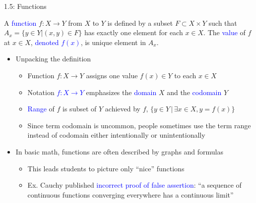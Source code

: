 \documentclass[10pt,english,aspectratio=169]{beamer}
\begin{document}
\begin{frame}{1.5: Functions}

\vspace{3mm}

\begin{definition}
A \textcolor{blue}{function} $f \colon X \rightarrow Y$ from $X$ to $Y$ is defined by a subset $F \subset X \times Y$ such that $A_x = \{ y\in Y | (x,y)\in F \}$ has exactly one element for each $x\in X$.
The \textcolor{blue}{value} of $f$ at $x\in X$, \textcolor{blue}{denoted $f(x)$}, is unique element in $A_x$.
\end{definition}

\begin{itemize}
\setlength\itemsep{3mm}
\item<2-> Unpacking the definition \vspace{1mm}
\begin{itemize} 
  \setlength\itemsep{1.5mm}
  \item<2-> Function $f \colon X\rightarrow Y$ assigns one value $f(x)\in Y$ to each $x\in X$
  \item<3-> Notation \textcolor{blue}{$f \colon X \rightarrow Y$} emphasizes the \textcolor{blue}{domain} $X$ and the \textcolor{blue}{codomain} $Y$
  \item<4-> \textcolor{blue}{Range} of $f$ is subset of $Y$ achieved by $f$, $\{y \in Y \,|\, \exists x\in X, y=f(x) \}$
  \item<5-> Since term codomain is uncommon, people sometimes use the term range instead of codomain either intentionally or unintentionally
\end{itemize}

\item<6-> In basic math, functions are often described by graphs and formulas \vspace{1mm}
\begin{itemize} 
  \setlength\itemsep{1.5mm}
  \item<6-> This leads students to picture only ``nice'' functions
  \item<7-> Ex. Cauchy published \textcolor{blue}{incorrect proof of false assertion}: ``a sequence of continuous functions converging everywhere has a continuous limit''
\end{itemize}

\end{itemize}
\end{frame}  
\end{document}
